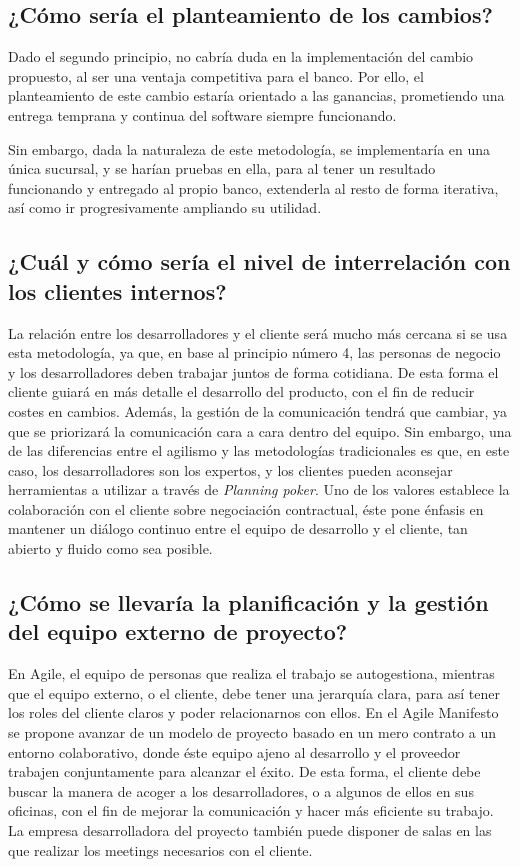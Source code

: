 \documentclass{article}
\begin{document}
\subsection{¿Cómo sería el planteamiento de los cambios?}

Dado el segundo principio, no cabría duda en la implementación del cambio propuesto, al ser una ventaja competitiva para el banco. Por ello, el planteamiento de este cambio estaría orientado a las ganancias, prometiendo una entrega temprana y continua del software siempre funcionando.

Sin embargo, dada la naturaleza de este metodología, se implementaría en una única sucursal, y se harían pruebas en ella, para al tener un resultado funcionando y entregado al propio banco, extenderla al resto de forma iterativa, así como ir progresivamente ampliando su utilidad.

\subsection{¿Cuál y cómo sería el nivel de interrelación con los clientes internos?}

La relación entre los desarrolladores y el cliente será mucho más cercana si se usa esta metodología, ya que, en base al principio número 4, las personas de negocio y los desarrolladores deben trabajar juntos de forma cotidiana. De esta forma el cliente guiará en más detalle el desarrollo del producto, con el fin de reducir costes en cambios. Además, la gestión de la comunicación tendrá que cambiar, ya que se priorizará la comunicación cara a cara dentro del equipo. Sin embargo, una de las diferencias entre el agilismo y las metodologías tradicionales es que, en este caso, los desarrolladores son los expertos, y los clientes pueden aconsejar herramientas a utilizar a través de \textit{Planning poker}. Uno de los valores establece la colaboración con el cliente sobre negociación contractual, éste pone énfasis en mantener un diálogo continuo entre el equipo de desarrollo y el cliente, tan abierto y fluido como sea posible.

\subsection{¿Cómo se llevaría la planificación y la gestión del equipo externo de proyecto?}

En Agile, el equipo de personas que realiza el trabajo se autogestiona, mientras que el equipo externo, o el cliente, debe tener una jerarquía clara, para así tener los roles del cliente claros y poder relacionarnos con ellos. En el Agile Manifesto se propone avanzar de un modelo de proyecto basado en un mero contrato a un entorno colaborativo, donde éste equipo ajeno al desarrollo y el proveedor trabajen conjuntamente para alcanzar el éxito. De esta forma, el cliente debe buscar la manera de acoger a los desarrolladores, o a algunos de ellos en sus oficinas, con el fin de mejorar la comunicación y hacer más eficiente su trabajo. La empresa desarrolladora del proyecto también puede disponer de salas en las que realizar los meetings necesarios con el cliente.
\end{document}
